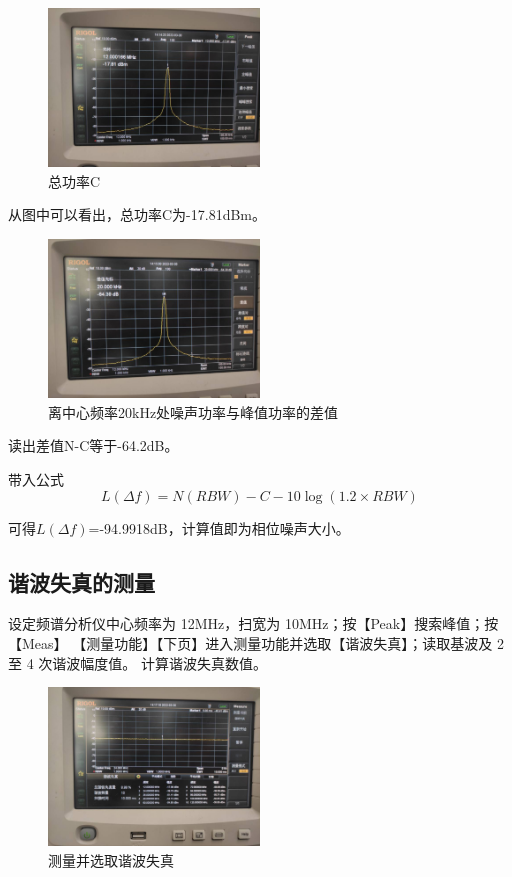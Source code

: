 \documentclass{../source/Experiment}
\begin{document}
        \begin{figure}[H]
            \centering
            \includegraphics[width = 0.5\textwidth]{lab3/1.jpg}
            \caption{总功率C}    
        \end{figure}
        从图中可以看出，总功率C为-17.81dBm。
        \begin{figure}[H]
            \centering
            \includegraphics[width = 0.5\textwidth]{lab3/2.jpg}
            \caption{离中心频率20kHz处噪声功率与峰值功率的差值}    
        \end{figure}
        读出差值N-C等于-64.2dB。
        
        带入公式$$L(\Delta f)=N(R B W)-C-10 \log (1.2 \times R B W)$$
        
        可得$L(\Delta f)$=-94.9918dB，计算值即为相位噪声大小。

        \subsection{谐波失真的测量}
        设定频谱分析仪中心频率为 12MHz，扫宽为 10MHz；按【Peak】搜索峰值；按【Meas】
        【测量功能】【下页】进入测量功能并选取【谐波失真】；读取基波及 2 至 4 次谐波幅度值。
        计算谐波失真数值。
        \begin{figure}[H]
            \centering
            \includegraphics[width = 0.5\textwidth]{lab3/3.jpg}
            \caption{测量并选取谐波失真}    
        \end{figure}
\end{document}
